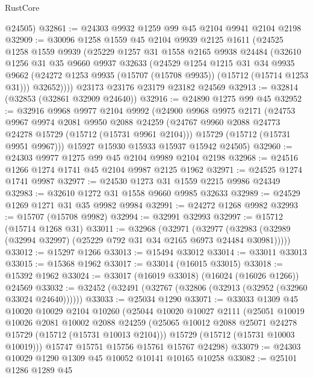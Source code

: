 \begin{lexlean}{RustCore}
\begin{coremodule}
      @24505)
@32861 := @24303 @9932 @1259 @99 @45 @2104 @9941 @2104 @2198
@32909 := @30096
    @1258
    @1559
    @45
    @2104
    @9939
    @2125
    @1611
    (@24525
      @1258
      @1559
      @9939
      (@25229
        @1257
        @31
        @1558
        @2165
        @9938
        @24484
        (@32610
          @1256
          @31
          @35
          @9660
          @9937
          @32633
          (@24529
            @1254
            @1215
            @31
            @34
            @9935
            @9662
            (@24272 @1253 @9935 (@15707 (@15708 @9935)) (@15712 (@15714 @1253 @31)))
            @32652))))
    @23173
    @23176
    @23179
    @23182
    @24569
@32913 := @32814 (@32853 (@32861 @32909 @24640))
@32916 := @24890 @1275 @99 @45
@32952 := @32916
    @9968
    @9977
    @2104
    @9992
    (@24900
      @9968
      @9975
      @2171
      (@24753
        @9967
        @9974
        @2081
        @9950
        @2088
        @24259
        (@24767 @9960 @2088 @24773 @24278 @15729 (@15712 (@15731 @9961 @2104)))
        @15729
        (@15712 (@15731 @9951 @9967)))
      @15927
      @15930
      @15933
      @15937
      @15942
      @24505)
@32960 := @24303 @9977 @1275 @99 @45 @2104 @9989 @2104 @2198
@32968 := @24516 @1266 @1274 @1741 @45 @2104 @9987 @2125 @1962
@32971 := @24525 @1274 @1741 @9987
@32977 := @24530 @1273 @31 @1559 @2215 @9986 @24349
@32983 := @32610 @1272 @31 @1558 @9660 @9985 @32633
@32989 := @24529 @1269 @1271 @31 @35 @9982 @9984
@32991 := @24272 @1268 @9982
@32993 := @15707 (@15708 @9982)
@32994 := @32991 @32993
@32997 := @15712 (@15714 @1268 @31)
@33011 := @32968
    (@32971
      (@32977 (@32983 (@32989 (@32994 @32997) (@25229 @792 @31 @34 @2165 @6973 @24484 @30981)))))
@33012 := @15297 @1266
@33013 := @15494 @33012
@33014 := @33011 @33013
@33015 := @15368 @1962
@33017 := @33014 (@16015 @33015)
@33018 := @15392 @1962
@33024 := @33017 (@16019 @33018) (@16024 (@16026 @1266)) @24569
@33032 := @32452 (@32491 (@32767 (@32806 (@32913 (@32952 (@32960 @33024 @24640))))))
@33033 := @25034 @1290
@33071 := @33033
    @1309
    @45
    @10020
    @10029
    @2104
    @10260
    (@25044
      @10020
      @10027
      @2111
      (@25051
        @10019
        @10026
        @2081
        @10002
        @2088
        @24259
        (@25065 @10012 @2088 @25071 @24278 @15729 (@15712 (@15731 @10013 @2104)))
        @15729
        (@15712 (@15731 @10003 @10019)))
      @15747
      @15751
      @15756
      @15761
      @15767
      @24298)
@33079 := @24303 @10029 @1290 @1309 @45 @10052 @10141 @10165 @10258
@33082 := @25101 @1286 @1289 @45

\end{coremodule}
\end{lexlean}
